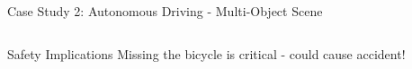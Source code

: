 \documentclass[usenames,dvipsnames]{beamer}
\begin{document}
\begin{frame}{Case Study 2: Autonomous Driving - Multi-Object Scene}
\begin{columns}
		\begin{column}{0.45\textwidth}
			\begin{alertbox}{Safety Implications}
			Missing the bicycle is critical - could cause accident!
			\end{alertbox}
		\end{column}
		\end{columns}
	\end{frame}
\end{document}
